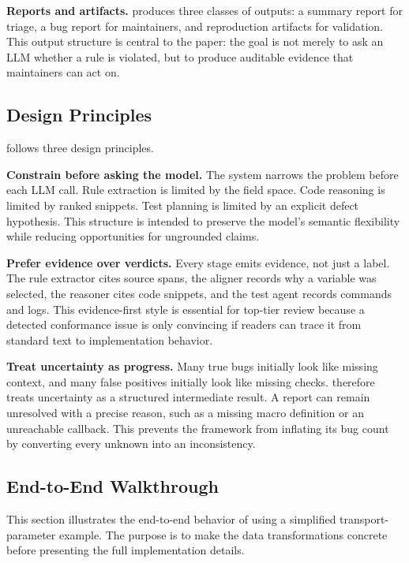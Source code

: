 \textbf{Reports and artifacts.}
\tool{} produces three classes of outputs: a summary report for triage, a bug
report for maintainers, and reproduction artifacts for validation. This output
structure is central to the paper: the goal is not merely to ask an LLM whether
a rule is violated, but to produce auditable evidence that maintainers can act
on.

\subsection{Design Principles}

\tool{} follows three design principles.

\textbf{Constrain before asking the model.}
The system narrows the problem before each LLM call. Rule extraction is limited
by the field space. Code reasoning is limited by ranked snippets. Test planning
is limited by an explicit defect hypothesis. This structure is intended to
preserve the model's semantic flexibility while reducing opportunities for
ungrounded claims.

\textbf{Prefer evidence over verdicts.}
Every stage emits evidence, not just a label. The rule extractor cites source
spans, the aligner records why a variable was selected, the reasoner cites code
snippets, and the test agent records commands and logs. This evidence-first
style is essential for top-tier review because a detected conformance issue is
only convincing if readers can trace it from standard text to implementation
behavior.

\textbf{Treat uncertainty as progress.}
Many true bugs initially look like missing context, and many false positives
initially look like missing checks. \tool{} therefore treats uncertainty as a
structured intermediate result. A report can remain unresolved with a precise
reason, such as a missing macro definition or an unreachable callback. This
prevents the framework from inflating its bug count by converting every unknown
into an inconsistency.

\subsection{End-to-End Walkthrough}
\label{sec:walkthrough}

This section illustrates the end-to-end behavior of \tool{} using a simplified
transport-parameter example. The purpose is to make the data transformations
concrete before presenting the full implementation details.


